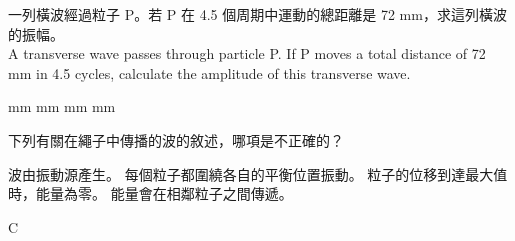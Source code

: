 {
    一列橫波經過粒子 P。若 P 在 4.5 個周期中運動的總距離是 72 mm，求這列橫波的振幅。
    \\A transverse wave passes through particle P. If P moves a total distance of 72 mm in 4.5 cycles, calculate the amplitude of this transverse wave.
    \begin{tasks}
         mm
         mm
         mm
         mm
    \end{tasks}

}{}

{

}{}

{
    下列有關在繩子中傳播的波的敘述，哪項是不正確的？
    \begin{tasks}
        \task 波由振動源產生。
        \task 每個粒子都圍繞各自的平衡位置振動。
        \task 粒子的位移到達最大值時，能量為零。
        \task 能量會在相鄰粒子之間傳遞。
    \end{tasks}

}{
    \mckey C
}

